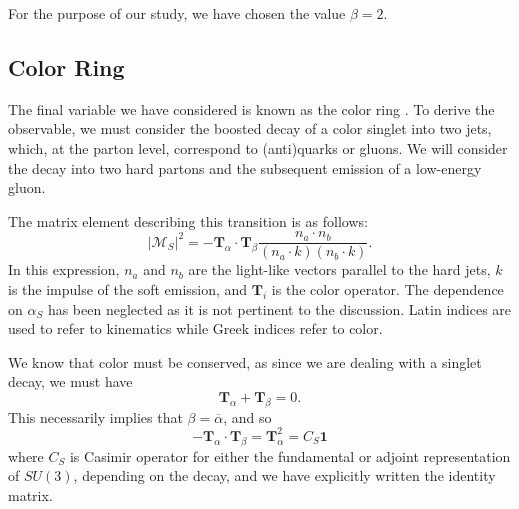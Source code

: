 \documentclass[10pt,a4paper]{book}
\begin{document}
For the purpose of our study, we have chosen the value $\beta = 2$.

\subsection{Color Ring}
The final variable we have considered is known as the color ring \cite{Buckley:2020kdp}. To derive the observable, we must consider the boosted decay of a color singlet into two jets, which, at the parton level, correspond to (anti)quarks or gluons. We will consider the decay into two hard partons and the subsequent emission of a low-energy gluon.

The matrix element describing this transition is as follows:
\begin{equation}
\vert \mathcal{M}_S \vert^2 = -\mathbf{T}_\alpha \cdot \mathbf{T}_\beta 	\frac{n_a \cdot n_b}{(n_a \cdot k)(n_b \cdot k)}.
\end{equation}
In this expression, $n_a$ and $n_b$ are the light-like vectors parallel to the hard jets, $k$ is the impulse of the soft emission, and $\mathbf{T}_i$ is the color operator. The dependence on $\alpha_S$ has been neglected as it is not pertinent to the discussion. Latin indices are used to refer to kinematics while Greek indices refer to color.

We know that color must be conserved, as since we are dealing with a singlet decay, we must have
\begin{equation}
\mathbf{T}_\alpha + \mathbf{T}_\beta = 0.
\end{equation}
This necessarily implies that $\beta = \overline{\alpha}$, and so
\begin{equation}
-\mathbf{T}_\alpha \cdot \mathbf{T}_\beta = \mathbf{T}_\alpha^2 = C_S\mathbf{1}
\end{equation}
where $C_S$ is Casimir operator for either the fundamental or adjoint representation of $SU(3)$, depending on the decay, and we have explicitly written the identity matrix. 
\end{document}
